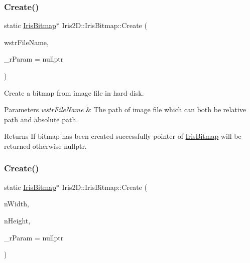 \subsubsection{\texorpdfstring{Create()}{Create()}\hspace{0.1cm}{\footnotesize\ttfamily [1/2]}}
{\footnotesize\ttfamily static \hyperlink{class_iris2_d_1_1_iris_bitmap}{Iris\+Bitmap}$\ast$ Iris2\+D\+::\+Iris\+Bitmap\+::\+Create (\begin{DoxyParamCaption}\item[{const std\+::wstring \&}]{wstr\+File\+Name,  }\item[{Iris\+Result $\ast$}]{\+\_\+r\+Param = {\ttfamily nullptr} }\end{DoxyParamCaption})\hspace{0.3cm}{\ttfamily [static]}}



Create a bitmap from image file in hard disk. 


\begin{DoxyParams}{Parameters}
{\em wstr\+File\+Name} & The path of image file which can both be relative path and absolute path. \\
\hline
\end{DoxyParams}
\begin{DoxyReturn}{Returns}
If bitmap has been created successfully pointer of \hyperlink{class_iris2_d_1_1_iris_bitmap}{Iris\+Bitmap} will be returned otherwise nullptr. 
\end{DoxyReturn}
\mbox{\label{class_iris2_d_1_1_iris_bitmap_a42a6c58440df5bb965a2d299cd3620e4}} 
\subsubsection{\texorpdfstring{Create()}{Create()}\hspace{0.1cm}{\footnotesize\ttfamily [2/2]}}
{\footnotesize\ttfamily static \hyperlink{class_iris2_d_1_1_iris_bitmap}{Iris\+Bitmap}$\ast$ Iris2\+D\+::\+Iris\+Bitmap\+::\+Create (\begin{DoxyParamCaption}\item[{unsigned int}]{n\+Width,  }\item[{unsigned int}]{n\+Height,  }\item[{Iris\+Result $\ast$}]{\+\_\+r\+Param = {\ttfamily nullptr} }\end{DoxyParamCaption})\hspace{0.3cm}{\ttfamily [static]}}



